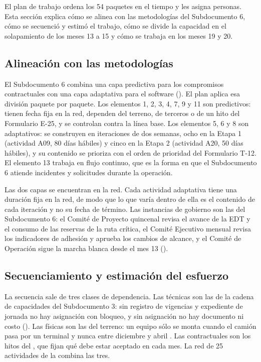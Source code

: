 El plan de trabajo ordena los 54 paquetes en el tiempo y les asigna personas. Esta sección explica cómo
se alinea con las metodologías del Subdocumento 6, cómo se secuenció y estimó el trabajo, cómo se divide
la capacidad en el solapamiento de los meses 13 a 15 y cómo se trabaja en los meses 19 y 20.

\subsection{Alineación con las metodologías}\label{sec:7-alineacion}

El Subdocumento 6 combina una capa predictiva para los compromisos contractuales con una capa adaptativa
para el software (). El plan aplica esa división paquete por paquete. Los
elementos 1, 2, 3, 4, 7, 9 y 11 son predictivos: tienen fecha fija en la red, dependen del terreno, de
terceros o de un hito del Formulario E-25, y se controlan contra la línea base. Los elementos 5, 6 y 8 son
adaptativos: se construyen en iteraciones de dos semanas, ocho en la Etapa 1 (actividad A09, 80 días
hábiles) y cinco en la Etapa 2 (actividad A20, 50 días hábiles), y su contenido se prioriza con el orden
de prioridad del Formulario T-12. El elemento 13 trabaja en flujo continuo, que es la forma en que el
Subdocumento 6 atiende incidentes y solicitudes durante la operación.

Las dos capas se encuentran en la red. Cada actividad adaptativa tiene una duración fija en la red, de modo
que lo que varía dentro de ella es el contenido de cada iteración y no su fecha de término. Las
instancias de gobierno son las del Subdocumento 6: el Comité de Proyecto quincenal revisa el avance de
la EDT y el consumo de las reservas de la ruta crítica, el Comité Ejecutivo mensual revisa los
indicadores de adhesión y aprueba los cambios de alcance, y el Comité de Operación sigue la marcha
blanca desde el mes 13 ().

\subsection{Secuenciamiento y estimación del esfuerzo}\label{sec:7-secuencia}

La secuencia sale de tres clases de dependencia. Las técnicas son las de la cadena de capacidades del
Subdocumento 3: sin registro de vigencias y expediente de jornada no hay asignación con bloqueo, y sin
asignación no hay documento ni costo (). Las físicas son las del terreno: un
equipo sólo se monta cuando el camión pasa por un terminal y nunca entre diciembre y abril
. Las contractuales son los hitos del , que fijan qué debe estar
aceptado en cada mes. La red de 25 actividades de la  combina las tres.

